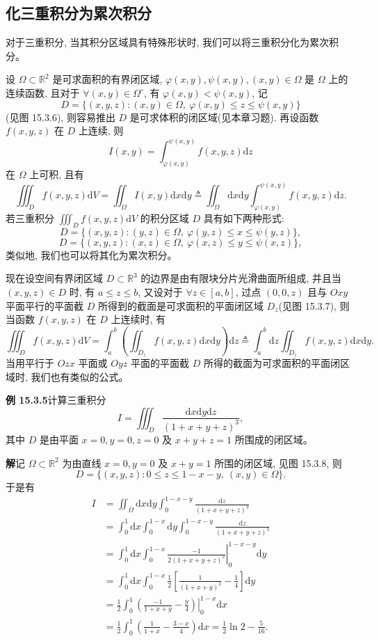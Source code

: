 \documentclass[UTF8, 12pt, fontset=fandol, oneside]{ctexart}
\begin{document}
\subsection{化三重积分为累次积分}

对于三重积分, 当其积分区域具有特殊形状时, 我们可以将三重积分化为累次积分。

设 $\Omega\subset\mathbb R^2$ 是可求面积的有界闭区域, $\varphi(x,y),\psi(x,y),(x,y)\in\Omega$ 是 $\Omega$ 上的连续函数, 且对于 $\forall(x,y)\in\Omega^\circ$, 有 $\varphi(x,y)<\psi(x,y)$, 记
\[
  D=\{(x,y,z):(x,y)\in\Omega,\ \varphi(x,y)\leqslant z\leqslant\psi(x,y)\}
\]
(见图 15.3.6), 则容易推出 $D$ 是可求体积的闭区域(见本章习题). 再设函数 $f(x,y,z)$ 在 $D$ 上连续, 则
\[
  I(x,y)=\int_{\varphi(x,y)}^{\psi(x,y)}f(x,y,z)\mathrm dz
\]
在 $\Omega$ 上可积, 且有
\[
  \iiint_D f(x,y,z)\mathrm dV
  =\iint_\Omega I(x,y)\mathrm dx\mathrm dy
  \triangleq \iint_\Omega\mathrm dx\mathrm dy
    \int_{\varphi(x,y)}^{\psi(x,y)}f(x,y,z)\mathrm dz.
\]
若三重积分 $\iiint_D f(x,y,z)\mathrm dV$ 的积分区域 $D$ 具有如下两种形式:
\[
  D=\{(x,y,z):(y,z)\in\Omega,\ \varphi(y,z)\leqslant x\leqslant\psi(y,z)\},
\]
\[
  D=\{(x,y,z):(x,z)\in\Omega,\ \varphi(x,z)\leqslant y\leqslant\psi(x,z)\},
\]
类似地, 我们也可以将其化为累次积分。

现在设空间有界闭区域 $D\subset\mathbb R^3$ 的边界是由有限块分片光滑曲面所组成, 并且当 $(x,y,z)\in D$ 时, 有 $a\leqslant z\leqslant b$, 又设对于 $\forall z\in[a,b]$, 过点 $(0,0,z)$ 且与 $Oxy$ 平面平行的平面截 $D$ 所得到的截面是可求面积的平面闭区域 $D_z$(见图 15.3.7), 则当函数 $f(x,y,z)$ 在 $D$ 上连续时, 有
\[
  \iiint_D f(x,y,z)\mathrm dV
  =\int_a^b\left(\iint_{D_z}f(x,y,z)\mathrm dx\mathrm dy\right)\mathrm dz
  \triangleq \int_a^b\mathrm dz\iint_{D_z}f(x,y,z)\mathrm dx\mathrm dy.
\]
当用平行于 $Ozx$ 平面或 $Oyz$ 平面的平面截 $D$ 所得的截面为可求面积的平面闭区域时, 我们也有类似的公式。

\noindent\textbf{例 15.3.5}\quad 计算三重积分
\[
  I=\iiint_D\frac{\mathrm dx\mathrm dy\mathrm dz}{(1+x+y+z)^3},
\]
其中 $D$ 是由平面 $x=0,y=0,z=0$ 及 $x+y+z=1$ 所围成的闭区域。

\noindent\textbf{解}\quad 记 $\Omega\subset\mathbb R^2$ 为由直线 $x=0,y=0$ 及 $x+y=1$ 所围的闭区域, 见图 15.3.8, 则
\[
  D=\{(x,y,z):0\leqslant z\leqslant1-x-y,\ (x,y)\in\Omega\}.
\]
于是有
\[
\begin{aligned}
  I
  &=\iint_\Omega\mathrm dx\mathrm dy\int_0^{1-x-y}\frac{\mathrm dz}{(1+x+y+z)^3}\\
  &=\int_0^1\mathrm dx\int_0^{1-x}\mathrm dy\int_0^{1-x-y}\frac{\mathrm dz}{(1+x+y+z)^3}\\
  &=\int_0^1\mathrm dx\int_0^{1-x}
    \left.\frac{-1}{2(1+x+y+z)^2}\right|_0^{1-x-y}\mathrm dy\\
  &=\int_0^1\mathrm dx\int_0^{1-x}\frac12\left[\frac1{(1+x+y)^2}-\frac14\right]\mathrm dy\\
  &=\frac12\int_0^1\left.\left(\frac{-1}{1+x+y}-\frac y4\right)\right|_0^{1-x}\mathrm dx\\
  &=\frac12\int_0^1\left(\frac1{1+x}-\frac{3-x}{4}\right)\mathrm dx
    =\frac12\ln2-\frac5{16}.
\end{aligned}
\]
\end{document}
